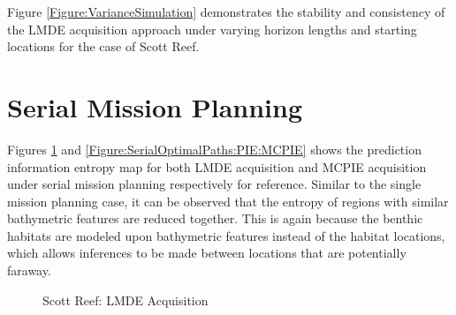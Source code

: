 			Figure \ref{Figure:VarianceSimulation} demonstrates the stability and consistency of the LMDE acquisition approach under varying horizon lengths and starting locations for the case of Scott Reef. 
			
	\section{Serial Mission Planning}
	\label{Appendix:SeafloorExplorationTimeLapse:Serial}
	
			Figures \ref{Figure:SerialOptimalPaths:PIE:LMDE} and \ref{Figure:SerialOptimalPaths:PIE:MCPIE} shows the prediction information entropy map for both LMDE acquisition and MCPIE acquisition under serial mission planning respectively for reference. Similar to the single mission planning case, it can be observed that the entropy of regions with similar bathymetric features are reduced together. This is again because the benthic habitats are modeled upon bathymetric features instead of the habitat locations, which allows inferences to be made between locations that are potentially faraway.
			
			\begin{figure}[!htbp]
			\centering
			\caption{Scott Reef: LMDE Acquisition}
			\label{Figure:SerialOptimalPaths:PIE:LMDE}
			\end{figure}
			
